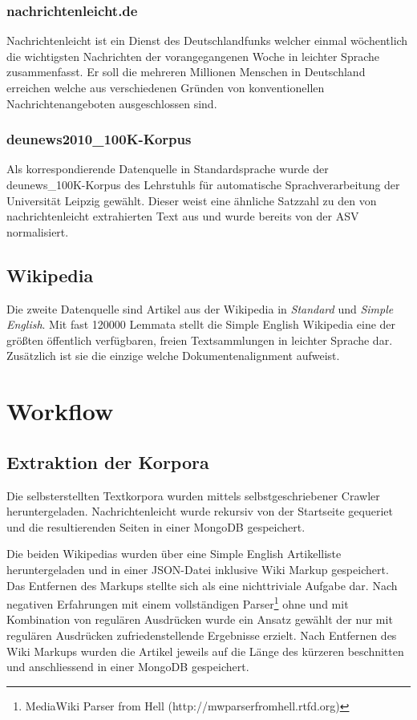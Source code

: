 \documentclass[12pt, a4paper]{article}
\begin{document}
\subsubsection{nachrichtenleicht.de}

Nachrichtenleicht ist ein Dienst des Deutschlandfunks welcher einmal
w\"ochentlich die wichtigsten Nachrichten der vorangegangenen Woche in leichter
Sprache zusammenfasst. Er soll die mehreren Millionen Menschen in Deutschland
erreichen welche aus verschiedenen Gr\"unden von konventionellen
Nachrichtenangeboten ausgeschlossen sind.

\subsubsection{deunews2010\_100K-Korpus}

Als korrespondierende Datenquelle in Standardsprache wurde der
deunews\_100K-Korpus des Lehrstuhls f\"ur automatische Sprachverarbeitung
der Universit\"at Leipzig gew\"ahlt. Dieser weist eine \"ahnliche Satzzahl zu
den von nachrichtenleicht extrahierten Text aus und wurde bereits von der ASV
normalisiert.

\subsection{Wikipedia}

Die zweite Datenquelle sind Artikel aus der Wikipedia in \emph{Standard} und
\emph{Simple English}. Mit fast 120000 Lemmata stellt die Simple English
Wikipedia eine der gr\"o\ss{}ten \"offentlich verf\"ugbaren, freien
Textsammlungen in leichter Sprache dar. Zus\"atzlich ist sie die einzige
welche Dokumentenalignment aufweist.

\section{Workflow}
\subsection{Extraktion der Korpora}

Die selbsterstellten Textkorpora wurden mittels selbstgeschriebener Crawler
heruntergeladen. Nachrichtenleicht wurde rekursiv von der Startseite gequeriet
und die resultierenden Seiten in einer MongoDB gespeichert. 

Die beiden Wikipedias wurden \"uber eine Simple English Artikelliste
heruntergeladen und in einer JSON-Datei inklusive Wiki Markup gespeichert. Das
Entfernen des Markups stellte sich als eine nichttriviale Aufgabe dar. Nach
negativen Erfahrungen mit einem vollst\"andigen Parser\footnote{MediaWiki
Parser from Hell (http://mwparserfromhell.rtfd.org)} ohne und mit Kombination
von regul\"aren Ausdr\"ucken wurde ein Ansatz gew\"ahlt der nur mit regul\"aren
Ausdr\"ucken zufriedenstellende Ergebnisse erzielt. Nach Entfernen des Wiki
Markups wurden die Artikel jeweils auf die L\"ange des k\"urzeren beschnitten
und anschliessend in einer MongoDB gespeichert.
\end{document}
